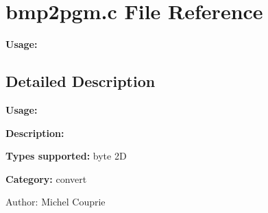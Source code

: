 \section{bmp2pgm.c File Reference}
\label{bmp2pgm_8c}
{\bf Usage:}  




\label{_details}
\subsection{Detailed Description}
{\bf Usage:} 

{\bf Description:}

{\bf Types supported:} byte 2D

{\bf Category:} convert

\begin{Desc}
\item[Author:]Michel Couprie \end{Desc}
